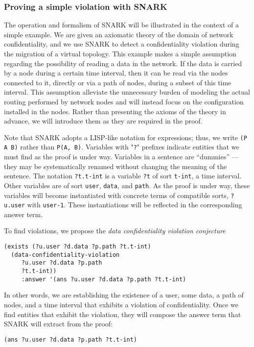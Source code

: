 \subsubsection{Proving a simple violation with SNARK}
\label{sec:find-violation}
The operation and formalism of SNARK will be illustrated in the context of a simple example.
We are given an axiomatic theory of the domain of network confidentiality, and we use SNARK to detect a confidentiality violation during the migration of a virtual topology.
This example makes a simple assumption regarding the possibility of reading a data in the network. If the data is carried by a node during a certain time interval, then it can be read via the nodes connected to it, directly or via a path of nodes, during a subset of this time interval.
This assumption alleviate the unnecessary burden of modeling the actual routing performed by network nodes and will instead focus on the configuration installed in the nodes.
Rather than presenting the axioms of the theory in advance, we will introduce them as they are required in the proof.

Note that SNARK adopts a LISP-like notation for expressions; thus, we write \verb'(P A B)' rather than \verb'P(A, B)'. 
Variables with "\verb'?'" prefixes indicate entities that we must find as the proof is under way.
Variables in a sentence are ``dummies'' \---- they may be systematically renamed without changing the meaning of the sentence. 
The notation \verb'?t.t-int' is a variable \verb'?t' of sort \verb't-int', \ie a time interval. 
Other variables are of sort \verb'user', \verb'data', and \verb'path'.
As the proof is under way, these variables will become instantiated with concrete terms of compatible sorts, \eg \verb'?u.user' with \verb'user-1'. 
These instantiations will be reflected in the corresponding answer term.

To find violations, we propose the \textit{data confidentiality violation conjecture}

\begin{lstlisting}[numbers=none] 
(exists (?u.user ?d.data ?p.path ?t.t-int)
  (data-confidentiality-violation 
     ?u.user ?d.data ?p.path 
     ?t.t-int))
     :answer '(ans ?u.user ?d.data ?p.path ?t.t-int)
\end{lstlisting}

In other words, we are establishing the existence of  a user, some data, a path of nodes, and a time interval that exhibits a violation of confidentiality. 
Once we find entities that exhibit the violation, they will compose the answer term that SNARK will extract from the proof:  
  \begin{lstlisting}[numbers=none] 
     (ans ?u.user ?d.data ?p.path ?t.t-int)
  \end{lstlisting}


